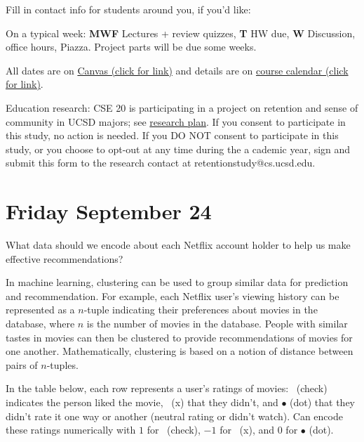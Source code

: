 \documentclass[12pt, oneside]{article}
\newcommand{\cmark}{\ding{51}}
\newcommand{\xmark}{\ding{55}}
\begin{document}
Fill in contact info for students around you, if you'd like:
\vspace{50pt}


On a typical week: {\bf MWF} Lectures + review quizzes, {\bf T} HW due, {\bf W} Discussion, office hours, Piazza. 
Project parts will be due some weeks.

All dates are on \href{https://canvas.ucsd.edu/}{Canvas (click for link)} and details are on
 \href{https://discrete-math-for-cs.github.io/website/overviewCalendar.html}{course calendar (click for link)}.

Education research: CSE 20 is participating in a project on retention and sense of community 
in UCSD majors; see \href{https://discrete-math-for-cs.github.io/files/CSInclusiveMentoringConsentFormNonCSEDataAnalysis.pdf}{research plan}. If you consent to participate in this study, no action is needed. 
If you DO NOT consent to participate in this study, or you choose to opt-out at any time during the a
cademic year, sign and submit this form to the research contact at retentionstudy@cs.ucsd.edu.


\newpage
\section*{Friday September 24}


What data should we encode about each Netflix account holder to help us make effective recommendations?

\vfill
\vfill

In machine learning, clustering can be used to group similar data for prediction and recommendation.  For example,
each Netflix user's viewing history can be represented as a $n$-tuple indicating their preferences about
movies in the database, where $n$ is the number of movies in the database.  People with similar tastes in movies can then be clustered to provide recommendations
of movies for one another.  Mathematically, clustering is based on a notion of distance between pairs of $n$-tuples.
 

In the table  below,  each row represents a user's ratings of movies: 
\cmark~(check) indicates the person liked the movie, \xmark~(x)
that they didn't, and $\bullet$ (dot) that they didn't rate it one way or 
another (neutral rating or didn't watch). Can encode
these ratings numerically with $1$ for \cmark~(check), $-1$ for \xmark~(x), 
and $0$ for $\bullet$ (dot).
\end{document}
